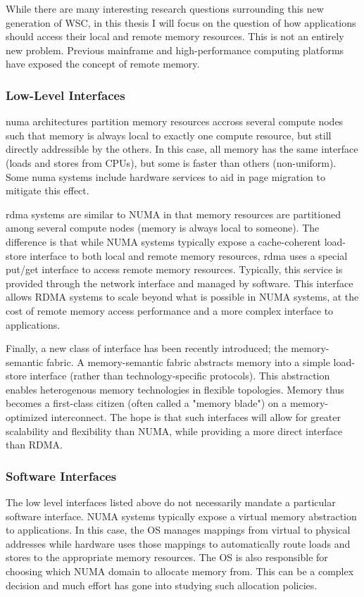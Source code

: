 While there are many interesting research questions surrounding this new
generation of WSC, in this thesis I will focus on the question of how
applications should access their local and remote memory resources. This is not
an entirely new problem. Previous mainframe and high-performance computing
platforms have exposed the concept of remote memory. 

\subsubsection{Low-Level Interfaces}
\Gls{numa} architectures partition memory resources
accross several compute nodes such that memory is always local to exactly one
compute resource, but still directly addressible by the others. In this case,
all memory has the same interface (loads and stores from CPUs), but some is
faster than others (non-uniform). Some \gls{numa} systems include hardware services
to aid in page migration to mitigate this effect\cite{sgi_origin}.

\gls{rdma} systems are similar to NUMA in that memory
resources are partitioned among several compute nodes (memory is always local
to someone). The difference is that while NUMA systems typically expose a
cache-coherent load-store interface to both local and remote memory resources,
\gls{rdma} uses a special put/get interface to access remote memory resources.
Typically, this service is provided through the network interface and managed
by software. This interface allows RDMA systems to scale beyond what is
possible in NUMA systems, at the cost of remote memory access performance and a
more complex interface to applications.

Finally, a new class of interface has been recently introduced; the
memory-semantic fabric. A memory-semantic fabric abstracts memory into a simple
load-store interface (rather than technology-specific protocols). This
abstraction enables heterogenous memory technologies in flexible topologies.
Memory thus becomes a first-class citizen (often called a "memory blade") on a
memory-optimized interconnect. The hope is that such interfaces will allow for
greater scalability and flexibility than NUMA, while providing a more direct
interface than RDMA\cite{genz}\cite{sonuma}. 

\subsubsection{Software Interfaces}
The low level interfaces listed above do not necessarily mandate a particular
software interface. NUMA systems typically expose a virtual memory abstraction
to applications. In this case, the OS manages mappings from virtual to physical
addresses while hardware uses those mappings to automatically route loads and
stores to the appropriate memory resources. The OS is also responsible for choosing which NUMA domain to
allocate memory from. This can be a complex decision and much effort has gone
into studying such allocation policies.

